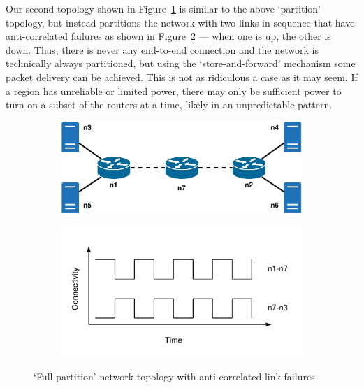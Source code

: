 \documentclass[withindex,glossary,openany]{cam-thesis}
\begin{document}
Our second topology shown in Figure~\ref{fig:full_partition_topology} is similar to the above `partition' topology, but instead partitions the network with two links in sequence that have anti-correlated failures as shown in Figure~\ref{fig:full_partition_graph} --- when one is up, the other is down. Thus, there is never any end-to-end connection and the network is technically always partitioned, but using the `store-and-forward' mechanism some packet delivery can be achieved. This is not as ridiculous a case as it may seem. If a region has unreliable or limited power, there may only be sufficient power to turn on a subset of the routers at a time, likely in an unpredictable pattern.

\begin{figure}[H]
\centering
\begin{subfigure}{.65\textwidth}
  \centering
  \includegraphics[width=1\linewidth]{delay_full_partition_topology}
  \caption{}
  \label{fig:full_partition_topology}
\end{subfigure}

\begin{subfigure}{.65\textwidth}
  \centering
  \includegraphics[width=1\linewidth]{delay_full_partition_graph}
  \caption{}
  \label{fig:full_partition_graph}
\end{subfigure}
\caption{`Full partition' network topology with anti-correlated link failures.}
\label{fig:full_partition}
\end{figure}
\end{document}
